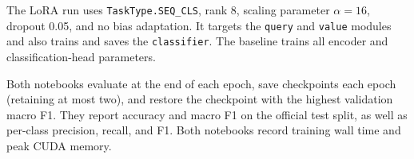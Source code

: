 The LoRA run uses \texttt{TaskType.SEQ\_CLS}, rank 8, scaling parameter $\alpha=16$, dropout 0.05, and no bias adaptation. It targets the \texttt{query} and \texttt{value} modules and also trains and saves the \texttt{classifier}. The baseline trains all encoder and classification-head parameters.

Both notebooks evaluate at the end of each epoch, save checkpoints each epoch (retaining at most two), and restore the checkpoint with the highest validation macro F1. They report accuracy and macro F1 on the official test split, as well as per-class precision, recall, and F1. Both notebooks record training wall time and peak CUDA memory.
